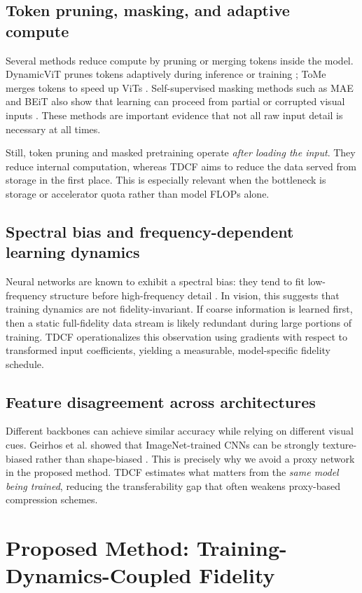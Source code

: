 \documentclass[10pt,twocolumn]{article}
\begin{document}
\subsection{Token pruning, masking, and adaptive compute}
Several methods reduce compute by pruning or merging tokens inside the model. DynamicViT prunes tokens adaptively during inference or training \cite{dynamicvit}; ToMe merges tokens to speed up ViTs \cite{tome}. Self-supervised masking methods such as MAE and BEiT also show that learning can proceed from partial or corrupted visual inputs \cite{mae,beit}. These methods are important evidence that not all raw input detail is necessary at all times.

Still, token pruning and masked pretraining operate \emph{after loading the input}. They reduce internal computation, whereas TDCF aims to reduce the data served from storage in the first place. This is especially relevant when the bottleneck is storage or accelerator quota rather than model FLOPs alone.

\subsection{Spectral bias and frequency-dependent learning dynamics}
Neural networks are known to exhibit a spectral bias: they tend to fit low-frequency structure before high-frequency detail \cite{rahaman2019spectral}. In vision, this suggests that training dynamics are not fidelity-invariant. If coarse information is learned first, then a static full-fidelity data stream is likely redundant during large portions of training. TDCF operationalizes this observation using gradients with respect to transformed input coefficients, yielding a measurable, model-specific fidelity schedule.

\subsection{Feature disagreement across architectures}
Different backbones can achieve similar accuracy while relying on different visual cues. Geirhos et al. showed that ImageNet-trained CNNs can be strongly texture-biased rather than shape-biased \cite{geirhos2019texture}. This is precisely why we avoid a proxy network in the proposed method. TDCF estimates what matters from the \emph{same model being trained}, reducing the transferability gap that often weakens proxy-based compression schemes.

\section{Proposed Method: Training-Dynamics-Coupled Fidelity}
\end{document}
